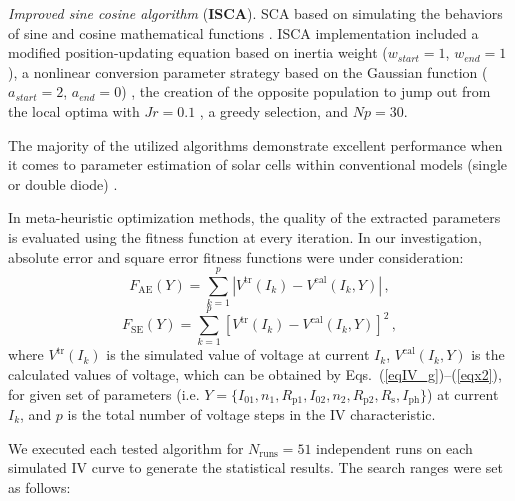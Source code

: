 \documentclass[a4paper,fleqn]{cas-dc}
\begin{document}
\emph{Improved sine cosine algorithm} (\textbf{ISCA}).
SCA based on simulating the behaviors of sine and cosine mathematical functions \cite{SCA}.
ISCA implementation included a modified position-updating equation based on inertia weight
($w_{start}=1$, $w_{end}=1$),
a nonlinear conversion parameter strategy based on the Gaussian function
($a_{start}=2$, $a_{end}=0$) \cite{ISCA2},
the creation of the opposite population to jump out from the local optima with $J\!r=0.1$ \cite{ISCA3},
a greedy selection, and $N\!p=30$.

The majority of the utilized algorithms demonstrate excellent performance when
it comes to parameter estimation of solar cells within conventional models (single or double diode) \cite{CWOA,DEWang,GOTLBO,IJAYA,MABC,PSO,STLBO,TLBO_Patel,LSHADE,IWOA}.

In meta-heuristic optimization methods, the quality of the extracted parameters is evaluated using the fitness function at
every iteration.
In our investigation, absolute error and square error fitness functions were under consideration:
\begin{equation}
\label{eqFae}
F_\mathrm{AE}(Y)= \sum_{k=1}^p \left|V^\mathrm{tr}(I_k)-V^\mathrm{cal}(I_k,Y)\right|\,,
\end{equation}
\begin{equation}
\label{eqFse}
F_\mathrm{SE}(Y)= \sum_{k=1}^p \left[V^\mathrm{tr}(I_k)-V^\mathrm{cal}(I_k,Y)\right]^2\,,
\end{equation}
where
$V^\mathrm{tr}(I_k)$ is the simulated value of voltage at current $I_k$,
$V^\mathrm{cal}(I_k,Y)$ is the calculated values of voltage, which can be obtained
by Eqs.~(\ref{eqIV_g})--(\ref{eqx2}),
for given set of parameters (i.e. $Y = \{I_{01},n_1,R_\mathrm{p1},I_{02},n_2,R_\mathrm{p2},R_\mathrm{s},I_\mathrm{ph}\}$)
at current $I_k$,
and $p$ is the total number of voltage steps in the IV characteristic.



We executed each tested algorithm for $N_\mathrm{runs}=51$ independent runs on each simulated IV curve
to generate the statistical results.
The search ranges were set as follows:
\end{document}
